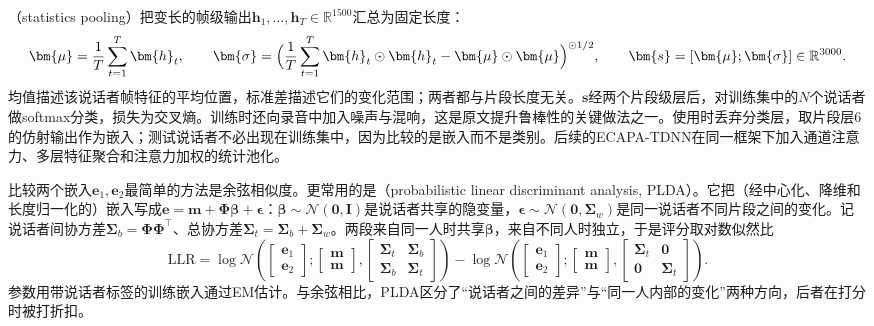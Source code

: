 （statistics pooling）把变长的帧级输出$\bm{h}_1,\ldots,\bm{h}_T\in\mathbb{R}^{1500}$汇总为固定长度：
\begin{equation}
 \bm{\mu}=\frac1T\sum_{t=1}^{T}\bm{h}_t,\qquad
 \bm{\sigma}=\Bigl(\frac1T\sum_{t=1}^{T}\bm{h}_t\odot\bm{h}_t-\bm{\mu}\odot\bm{\mu}\Bigr)^{\odot1/2},\qquad
 \bm{s}=[\bm{\mu};\bm{\sigma}]\in\mathbb{R}^{3000}.
 \label{eq:nlp-speech-stats-pooling}
\end{equation}
均值描述该说话者帧特征的平均位置，标准差描述它们的变化范围；两者都与片段长度无关。$\bm{s}$经两个片段级层后，对训练集中的$N$个说话者做softmax分类，损失为交叉熵。训练时还向录音中加入噪声与混响，这是原文提升鲁棒性的关键做法之一。使用时丢弃分类层，取片段层6的仿射输出作为嵌入；测试说话者不必出现在训练集中，因为比较的是嵌入而不是类别。后续的ECAPA-TDNN在同一框架下加入通道注意力、多层特征聚合和注意力加权的统计池化。

比较两个嵌入$\bm{e}_1,\bm{e}_2$最简单的方法是余弦相似度。更常用的是（probabilistic linear discriminant analysis, PLDA）。它把（经中心化、降维和长度归一化的）嵌入写成$\bm{e}=\bm{m}+\bm{\Phi}\bm{\beta}+\bm{\epsilon}$：$\bm{\beta}\sim\mathcal{N}(\bm{0},\bm{I})$是说话者共享的隐变量，$\bm{\epsilon}\sim\mathcal{N}(\bm{0},\bm{\Sigma}_w)$是同一说话者不同片段之间的变化。记说话者间协方差$\bm{\Sigma}_b=\bm{\Phi}\bm{\Phi}^{\top}$、总协方差$\bm{\Sigma}_t=\bm{\Sigma}_b+\bm{\Sigma}_w$。两段来自同一人时共享$\bm{\beta}$，来自不同人时独立，于是评分取对数似然比
\begin{equation}
 \mathrm{LLR}=\log\mathcal{N}\!\left(\begin{bmatrix}\bm{e}_1\\\bm{e}_2\end{bmatrix};
   \begin{bmatrix}\bm{m}\\\bm{m}\end{bmatrix},
   \begin{bmatrix}\bm{\Sigma}_t&\bm{\Sigma}_b\\\bm{\Sigma}_b&\bm{\Sigma}_t\end{bmatrix}\right)
 -\log\mathcal{N}\!\left(\begin{bmatrix}\bm{e}_1\\\bm{e}_2\end{bmatrix};
   \begin{bmatrix}\bm{m}\\\bm{m}\end{bmatrix},
   \begin{bmatrix}\bm{\Sigma}_t&\bm{0}\\\bm{0}&\bm{\Sigma}_t\end{bmatrix}\right).
 \label{eq:nlp-speech-plda}
\end{equation}
参数用带说话者标签的训练嵌入通过EM估计。与余弦相比，PLDA区分了“说话者之间的差异”与“同一人内部的变化”两种方向，后者在打分时被打折扣。


